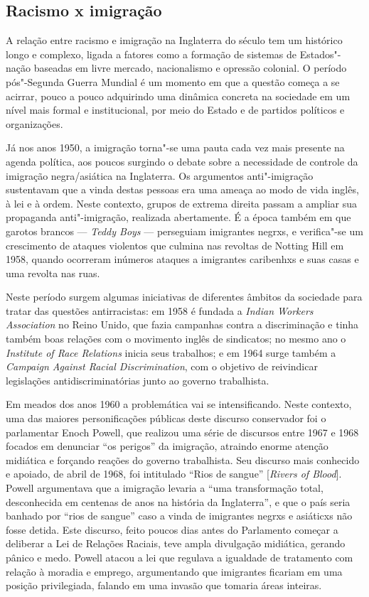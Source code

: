 \subsection{Racismo x imigração}

A relação entre racismo e imigração na Inglaterra do século  tem um histórico longo e complexo, ligada a fatores como a formação de sistemas de Estados"-nação baseadas em livre mercado, nacionalismo e opressão colonial. O período pós"-Segunda Guerra Mundial é um momento em que a questão começa a se acirrar, pouco a pouco adquirindo uma dinâmica concreta na sociedade em um nível mais formal e institucional, por meio do Estado e de partidos políticos e organizações.

Já nos anos 1950, a imigração torna"-se uma pauta cada vez mais presente na agenda política, aos poucos surgindo o debate sobre a necessidade de controle da imigração negra/asiática na Inglaterra. Os argumentos anti"-imigração sustentavam que a vinda destas pessoas era uma ameaça ao modo de vida inglês, à lei e à ordem. Neste contexto, grupos de extrema direita passam a ampliar sua propaganda anti"-imigração, realizada abertamente. É a época também em que garotos brancos --- \emph{Teddy Boys} --- perseguiam imigrantes negrxs, e verifica"-se um crescimento de ataques violentos que culmina nas revoltas de Notting Hill em 1958, quando ocorreram inúmeros ataques a imigrantes caribenhxs e suas casas e uma revolta nas ruas.

Neste período surgem algumas iniciativas de diferentes âmbitos da sociedade para tratar das questões antirracistas: em 1958 é fundada a \emph{Indian Workers Association} no Reino Unido, que fazia campanhas contra a discriminação e tinha também boas relações com o movimento inglês de sindicatos; no mesmo ano o \emph{Institute of Race Relations} inicia seus trabalhos; e em 1964 surge também a \emph{Campaign Against Racial Discrimination}, com o objetivo de reivindicar legislações antidiscriminatórias junto ao governo trabalhista.

Em meados dos anos 1960 a problemática vai se intensificando. Neste contexto, uma das maiores personificações públicas deste discurso conservador foi o parlamentar Enoch Powell, que realizou uma série de discursos entre 1967 e 1968 focados em denunciar ``os perigos'' da imigração, atraindo enorme atenção midiática e forçando reações do governo trabalhista. Seu discurso mais conhecido e apoiado, de abril de 1968, foi intitulado ``Rios de sangue'' [\emph{Rivers of Blood}]. Powell argumentava que a imigração levaria a ``uma transformação total, desconhecida em centenas de anos na história da Inglaterra'', e que o país seria banhado por ``rios de sangue'' caso a vinda de imigrantes negrxs e asiáticxs não fosse detida. Este discurso, feito poucos dias antes do Parlamento começar a deliberar a Lei de Relações Raciais, teve ampla divulgação midiática, gerando pânico e medo. Powell atacou a lei que regulava a igualdade de tratamento com relação à moradia e emprego, argumentando que imigrantes ficariam em uma posição privilegiada, falando em uma invasão que tomaria áreas inteiras.

